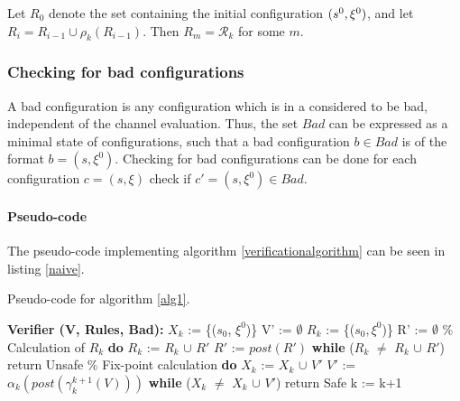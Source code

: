 Let $R_0$ denote the set containing the initial configuration $(s^0, \xi^0)$, and let $R_i = R_{i-1} \cup \rho_k(R_{i-1})$. Then $R_m = \mathcal{R}_k$ for some $m$.

\subsubsection{Checking for bad configurations}
\label{part3}
A bad configuration is any configuration which is in a  considered to be bad, independent of the channel evaluation. Thus, the set $Bad$ can be expressed as a minimal state of configurations, such that a bad configuration $b \in Bad$ is of the format $b = (s, \xi^0)$. Checking for bad configurations can be done for each configuration $c = (s, \xi)$ check if $c' = (s, \xi^0) \in Bad$.


\paragraph{Pseudo-code}
The pseudo-code implementing algorithm \ref{verificationalgorithm} can be seen in listing \ref{naive}. 

\begin{algorithm}
  \caption{Pseudo-code for algorithm \ref{alg1}.}
	\label{naive}
  \begin{algorithmic}[1]
    \State \textbf{Verifier (V, Rules, Bad):}
	\State $X_k$ := \{($s_0$, $\xi^0$)\}
	\State V' := $\emptyset$
	\State $R_k$ := \{($s_0, \xi^0$)\}
	\State R' := $\emptyset$
	\State \% Calculation of $R_k$
	\State \textbf{do}
	\State \hspace{10pt} $R_k$ := $R_k$ $\cup$ $R'$
        \State \hspace{10pt} $R'$ := $post(R')$
	\State \hspace{10pt} \textbf{while} ($R_k$ $\neq$ $R_k$ $\cup$ $R'$)
        \State return Unsafe
        \EndIf 
	\State 
	\State \% Fix-point calculation
	\State \textbf{do}
	\State \hspace{10pt} $X_k$ := $X_k$ $\cup$ $V'$
        \State \hspace{10pt} $V'$ := $\alpha_k(post(\gamma_k^{k+1}(V)))$
	\State \hspace{10pt} \textbf{while} ($X_k$ $\neq$ $X_k$ $\cup$ $V'$)
        \State return Safe
        \EndIf
        \State k := k+1
      \EndFor
\end{algorithmic}
\end{algorithm}

